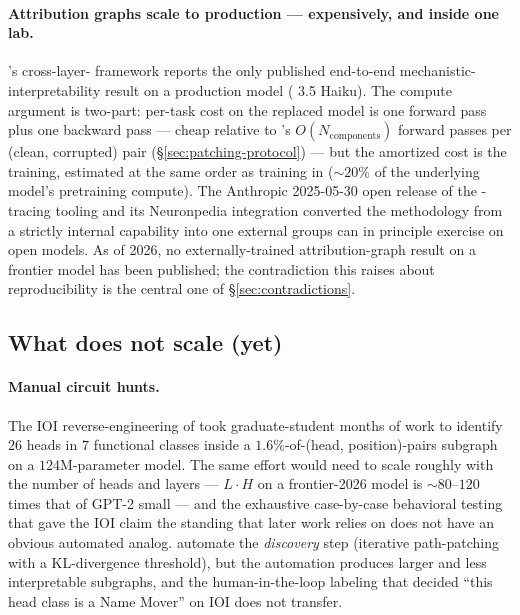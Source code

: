 \paragraph{Attribution graphs scale to production --- expensively, and
inside one lab.}
\citet{lindsey2025-circuit-tracing}'s cross-layer- framework
reports the only published end-to-end mechanistic-interpretability
result on a production model ( 3.5 Haiku). The compute argument
is two-part: per-task cost on the replaced model is one forward pass
plus one backward pass --- cheap relative to 's
$O(N_{\mathrm{components}})$ forward passes per (clean, corrupted) pair
(\S\ref{sec:patching-protocol}) --- but the amortized cost is the
 training, estimated at the same order as 
training in \citet{gemma-scope-2024} ($\sim\! 20\%$ of the underlying
model's pretraining compute). The Anthropic 2025-05-30 open release of
the -tracing tooling and its Neuronpedia integration
 converted the methodology from a strictly internal
capability into one external groups can in principle exercise on open
models. As of 2026, no externally-trained attribution-graph result on a
frontier model has been published; the contradiction this raises about
reproducibility is the central one of \S\ref{sec:contradictions}.

\subsection{What does not scale (yet)}
\label{sec:scaling-no}

\paragraph{Manual circuit hunts.}
The IOI reverse-engineering of \citet{wang2022-ioi} took graduate-student
months of work to identify $26$ heads in $7$ functional classes inside a
$1.6\%$-of-(head, position)-pairs subgraph on a $124$M-parameter model.
The same effort would need to scale roughly with the number of heads
and layers --- $L \cdot H$ on a frontier-2026 model is $\sim 80$--$120$
times that of GPT-2 small --- and the exhaustive case-by-case behavioral
testing that gave the IOI claim the standing that later work relies on does not have an
obvious automated analog. \citet{conmy2023-acdc} automate the
\emph{discovery} step (iterative path-patching with a KL-divergence
threshold), but the automation produces larger and less interpretable
subgraphs, and the human-in-the-loop labeling that decided ``this head
class is a Name Mover'' on IOI does not transfer.

